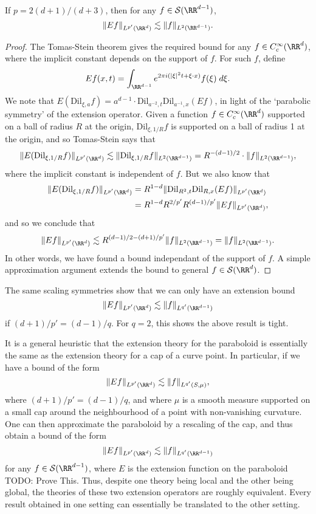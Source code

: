 \begin{theorem}
  If $p = 2(d+1)/(d+3)$, then for any $f \in \mathcal{S}(\RR^{d-1})$,
  \[ \| Ef \|_{L^{p'}(\RR^d)} \lesssim \| f \|_{L^2(\RR^{d-1})}. \]
\end{theorem}
\begin{proof}
  The Tomas-Stein theorem gives the required bound for any $f \in C_c^\infty(\RR^d)$, where the implicit constant depends on the support of $f$. For such $f$, define
  \[ Ef(x,t) = \int_{\RR^{d-1}} e^{2 \pi i (|\xi|^2 t + \xi \cdot x)} f(\xi)\; d\xi. \]
  We note that $E(\text{Dil}_{\xi,a} f) = a^{d-1} \cdot \text{Dil}_{a^{-2},t} \text{Dil}_{a^{-1},x}(Ef)$, in light of the `parabolic symmetry' of the extension operator. Given a function $f \in C_c^\infty(\RR^d)$ supported on a ball of radius $R$ at the origin, $\text{Dil}_{\xi,1/R} f$ is supported on a ball of radius 1 at the origin, and so Tomas-Stein says that
  \[ \| E(\text{Dil}_{\xi,1/R} f) \|_{L^{p'}(\RR^d)} \lesssim \| \text{Dil}_{\xi,1/R} f \|_{L^2(\RR^{d-1})} = R^{-(d-1)/2} \cdot \| f \|_{L^2(\RR^{d-1})}, \]
  where the implicit constant is independent of $f$. But we also know that
  \begin{align*}
    \| E(\text{Dil}_{\xi,1/R} f) \|_{L^{p'}(\RR^d)} &= R^{1-d} \| \text{Dil}_{R^2,t} \text{Dil}_{R,x}(Ef) \|_{L^{p'}(\RR^d)}\\
    &= R^{1-d} R^{2/p'} R^{(d-1)/p'} \| Ef \|_{L^{p'}(\RR^d)},
  \end{align*}
  and so we conclude that
  \[ \| Ef \|_{L^{p'}(\RR^d)} \lesssim R^{(d-1)/2-(d+1)/p'} \| f \|_{L^2(\RR^{d-1})} = \| f \|_{L^2(\RR^{d-1})}. \]
  In other words, we have found a bound independant of the support of $f$. A simple approximation argument extends the bound to general $f \in \mathcal{S}(\RR^d)$.
\end{proof}

\begin{remark}
  The same scaling symmetries show that we can only have an extension bound
  \[ \| Ef \|_{L^{p'}(\RR^d)} \lesssim \| f \|_{L^{q'}(\RR^{d-1})} \]
  if $(d+1)/p' = (d-1)/q$. For $q = 2$, this shows the above result is tight.
\end{remark}

It is a general heuristic that the extension theory for the paraboloid is essentially the same as the extension theory for a cap of a curve point. In particular, if we have a bound of the form
%
\[ \| Ef \|_{L^{p'}(\RR^d)} \lesssim \| f \|_{L^{q'}(S,\mu)}, \]
%
where $(d+1)/p' = (d-1)/q$, and where $\mu$ is a smooth measure supported on a small cap around the neighbourhood of a point with non-vanishing curvature. One can then approximate the paraboloid by a rescaling of the cap, and thus obtain a bound of the form
%
\[ \| Ef \|_{L^{p'}(\RR^d)} \lesssim \| f \|_{L^{q'}(\RR^{d-1})} \]
%
for any $f \in \mathcal{S}(\RR^{d-1})$, where $E$ is the extension function on the paraboloid TODO: Prove This. Thus, despite one theory being local and the other being global, the theories of these two extension operators are roughly equivalent. Every result obtained in one setting can essentially be translated to the other setting.

